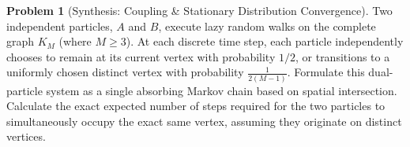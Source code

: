 \documentclass[11pt, a4paper]{article}
\theoremstyle{definition}
\newtheorem{problem}{Problem}
\theoremstyle{plain}
\begin{document}
\vspace{0.5cm}

\begin{problem}[Synthesis: Coupling \& Stationary Distribution Convergence]
Two independent particles, $A$ and $B$, execute lazy random walks on the complete graph $K_M$ (where $M \ge 3$). At each discrete time step, each particle independently chooses to remain at its current vertex with probability $1/2$, or transitions to a uniformly chosen distinct vertex with probability $\frac{1}{2(M-1)}$.
Formulate this dual-particle system as a single absorbing Markov chain based on spatial intersection. Calculate the exact expected number of steps required for the two particles to simultaneously occupy the exact same vertex, assuming they originate on distinct vertices.
\end{problem}
\end{document}
